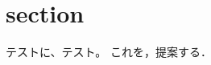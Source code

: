 \documentclass[a4paper]{jsarticle}
\begin{document}
\section{section}
テストに、テスト。
これを，提案する．
\end{document}
